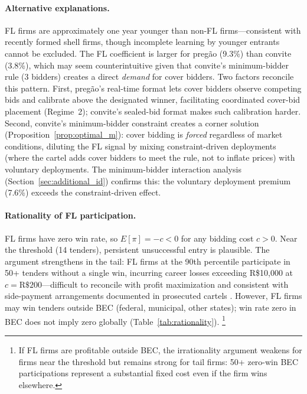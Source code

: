 \paragraph{Alternative explanations.}
FL firms are approximately one year younger than non-FL firms---consistent
with recently formed shell firms, though incomplete learning by younger
entrants cannot be excluded. The FL coefficient is larger for preg\~ao (9.3\%) than convite
(3.8\%), which may seem counterintuitive given that convite's
minimum-bidder rule (3 bidders) creates a direct \emph{demand} for
cover bidders. Two factors reconcile this pattern. First, preg\~ao's
real-time format lets cover bidders observe competing bids and
calibrate above the designated winner, facilitating coordinated
cover-bid placement (Regime~2); convite's sealed-bid format makes
such calibration harder. Second, convite's minimum-bidder constraint
creates a corner solution (Proposition~\ref{prop:optimal_m}): cover
bidding is \emph{forced} regardless of market conditions, diluting
the FL signal by mixing constraint-driven deployments (where the
cartel adds cover bidders to meet the rule, not to inflate prices)
with voluntary deployments. The minimum-bidder interaction analysis
(Section~\ref{sec:additional_id}) confirms this: the voluntary
deployment premium (7.6\%) exceeds the constraint-driven effect.

\paragraph{Rationality of FL participation.}
\label{sec:rationality}
FL firms have zero win rate, so $E[\pi] = -c < 0$ for any bidding cost
$c > 0$. Near the threshold (14 tenders), persistent unsuccessful entry
is plausible. The argument strengthens in the tail: FL firms at the
90th percentile participate in 50+ tenders without a single win,
incurring career losses exceeding R\$10{,}000 at $c = \text{R\$200}$---difficult to reconcile with profit maximization and consistent with
side-payment arrangements documented in prosecuted cartels
\citep{asker2010leniency, marshall2012economics}. However, FL firms may
win tenders outside BEC (federal, municipal, other states); win rate
zero in BEC does not imply zero globally
(Table~\ref{tab:rationality}).%
\footnote{If FL firms are profitable outside BEC, the irrationality
argument weakens for firms near the threshold but remains strong for
tail firms: 50+ zero-win BEC participations represent a substantial
fixed cost even if the firm wins elsewhere.}




